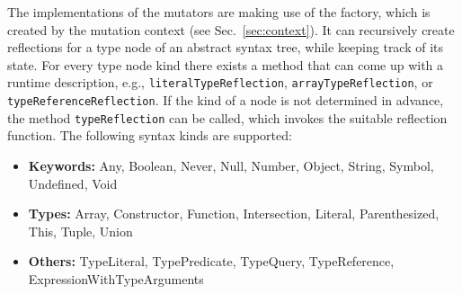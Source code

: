 The implementations of the mutators are making use of the factory, which is created by the mutation context (see Sec.~\ref{sec:context}). It can recursively create reflections for a type node of an abstract syntax tree, while keeping track of its state. For every type node kind there exists a method that can come up with a runtime description, e.g., \texttt{literalTypeReflection}, \texttt{arrayTypeReflection}, or \texttt{typeReferenceReflection}. If the kind of a node is not determined in advance, the method \texttt{typeReflection} can be called, which invokes the suitable reflection function. The following syntax kinds are supported:
\begin{itemize}
  \item \textbf{Keywords:} Any, Boolean, Never, Null, Number, Object, String, Symbol, Undefined, Void
  \item \textbf{Types:} Array, Constructor, Function, Intersection, Literal, Parenthesized, This, Tuple, Union
  \item \textbf{Others:} TypeLiteral, TypePredicate, TypeQuery, TypeReference, ExpressionWithTypeArguments
\end{itemize}
